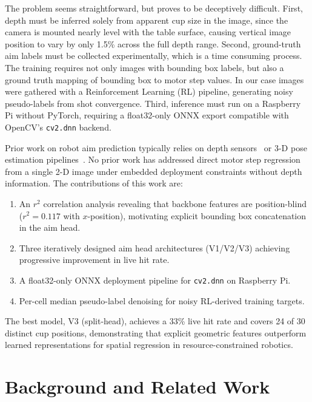 \documentclass[conference]{IEEEtran}
\begin{document}
The problem seems straightforward, but proves to be deceptively difficult.
First, depth must be inferred solely from apparent cup size in the image, since
the camera is mounted nearly level with the table surface, causing vertical
image position to vary by only 1.5\% across the full depth range. Second,
ground-truth aim labels must be collected experimentally, which is a time
consuming process. The training requires not only images with bounding box labels,
but also a ground truth mapping of bounding box to motor step values. In our case
images were gathered with a Reinforcement Learning (RL) pipeline, generating
noisy pseudo-labels from shot convergence. Third, inference must run on a
Raspberry Pi without PyTorch, requiring a float32-only ONNX export compatible
with OpenCV's \texttt{cv2.dnn} backend.

Prior work on robot aim prediction typically relies on depth
sensors~\cite{saxena2008,redmon2015} or 3-D pose estimation
pipelines~\cite{lepetit2009}.  No prior work has addressed direct motor step
regression from a single 2-D image under embedded deployment constraints
without depth information.  The contributions of this work are:
\begin{enumerate}
  \item An $r^{2}$ correlation analysis revealing that backbone features are
        position-blind ($r^{2}=0.117$ with $x$-position), motivating explicit
        bounding box concatenation in the aim head.
  \item Three iteratively designed aim head architectures (V1/V2/V3) achieving
        progressive improvement in live hit rate.
  \item A float32-only ONNX deployment pipeline for \texttt{cv2.dnn} on
        Raspberry Pi.
  \item Per-cell median pseudo-label denoising for noisy RL-derived training
        targets.
\end{enumerate}

The best model, V3 (split-head), achieves a 33\% live hit rate and covers 24
of 30 distinct cup positions, demonstrating that explicit geometric features
outperform learned representations for spatial regression in
resource-constrained robotics.

\section{Background and Related Work}
\label{sec:background}
\end{document}
